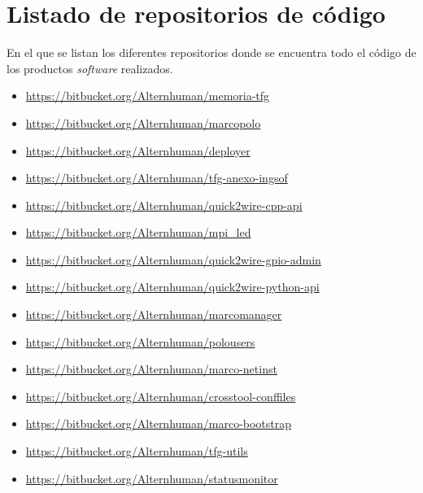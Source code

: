 \chapter{Listado de repositorios de código}

\begin{elements}
En el que se listan los diferentes repositorios donde se encuentra todo el código de los productos \textit{software} realizados.
\end{elements}

\begin{itemize}
\item \href{https://bitbucket.org/Alternhuman/memoria-tfg}{https://bitbucket.org/Alternhuman/memoria-tfg}
\item \href{https://bitbucket.org/Alternhuman/marcopolo}{https://bitbucket.org/Alternhuman/marcopolo}
\item \href{https://bitbucket.org/Alternhuman/deployer}{https://bitbucket.org/Alternhuman/deployer}
\item \href{https://bitbucket.org/Alternhuman/tfg-anexo-ingsof}{https://bitbucket.org/Alternhuman/tfg-anexo-ingsof}
\item \href{https://bitbucket.org/Alternhuman/quick2wire-cpp-api}{https://bitbucket.org/Alternhuman/quick2wire-cpp-api}
\item \href{https://bitbucket.org/Alternhuman/mpi_led}{https://bitbucket.org/Alternhuman/mpi\_led}
\item \href{https://bitbucket.org/Alternhuman/quick2wire-gpio-admin}{https://bitbucket.org/Alternhuman/quick2wire-gpio-admin}
\item \href{https://bitbucket.org/Alternhuman/quick2wire-python-api}{https://bitbucket.org/Alternhuman/quick2wire-python-api} %
\item \href{https://bitbucket.org/Alternhuman/marcomanager}{https://bitbucket.org/Alternhuman/marcomanager}
\item \href{https://bitbucket.org/Alternhuman/polousers}{https://bitbucket.org/Alternhuman/polousers}
\item \href{https://bitbucket.org/Alternhuman/marco-netinst}{https://bitbucket.org/Alternhuman/marco-netinst}
\item \href{https://bitbucket.org/Alternhuman/crosstool-conffiles}{https://bitbucket.org/Alternhuman/crosstool-conffiles}
\item \href{https://bitbucket.org/Alternhuman/marco-bootstrap}{https://bitbucket.org/Alternhuman/marco-bootstrap}
\item \href{https://bitbucket.org/Alternhuman/tfg-utils}{https://bitbucket.org/Alternhuman/tfg-utils}
\item \href{https://bitbucket.org/Alternhuman/statusmonitor}{https://bitbucket.org/Alternhuman/statusmonitor}
\end{itemize}

